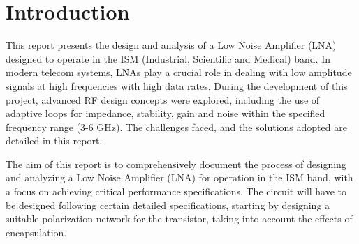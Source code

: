 \section{Introduction}

\label{sec:intro}
 This report presents the design and analysis of a Low Noise Amplifier (LNA) designed to operate in the ISM (Industrial, Scientific and Medical) band. In modern telecom systems, LNAs play a crucial role in dealing with low amplitude signals
 at high frequencies with high data rates. During the development of this project, advanced RF design concepts were explored, including the use of adaptive loops for impedance, stability, gain and noise within the specified frequency range (3-6 GHz). The challenges faced, and the solutions adopted are detailed in this report.

 The aim of this report is to comprehensively document the process of designing and analyzing
 a Low Noise Amplifier (LNA) for operation in the ISM band, with a focus on achieving critical performance specifications. The circuit will have to be designed following certain detailed specifications, starting by designing a suitable polarization network for the transistor, taking into account the effects of encapsulation.

